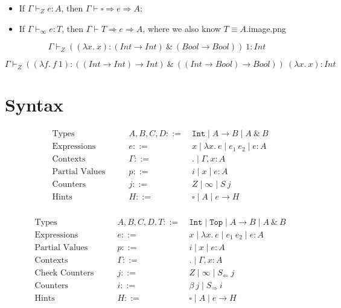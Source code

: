 \documentclass{article}
\begin{document}
\begin{itemize}
  \item If $\Gamma \vdash_Z e : A$, then $\Gamma \vdash \square \Rightarrow e \Rightarrow A$;
  \item If $\Gamma \vdash_{\infty} e : T$, then $\Gamma \vdash T \Rightarrow e \Rightarrow A$, where we also know $T \equiv A$.image.png
\end{itemize}



$$
\Gamma \vdash_{Z} ((\lambda x.~x) : (Int \to Int) ~\&~ (Bool \to Bool))~1 : Int
$$

$$
\Gamma \vdash_{Z} ((\lambda f. ~f~1) : ((Int \rightarrow Int) \to Int) ~\&~ ((Int \rightarrow Bool) \to Bool)) ~(\lambda x.~x) : Int
$$

\section{Syntax}

\begin{align*}
&\text{Types} \quad\quad &A, B, C, D ::=&~ \mathtt{Int} \mid A \rightarrow B \mid A ~\&~ B\\
&\text{Expressions} \quad \quad &e::=&~ x \mid \lambda x . ~e \mid e_1~e_2 \mid e : A\\
&\text{Contexts} \quad\quad &\Gamma::=&~ . \mid \Gamma, x : A\\
&\text{Partial Values} \quad \quad &p::=&~ i \mid x \mid e : A\\
&\text{Counters} \quad\quad &j ::=&~ Z \mid \infty \mid S~j\\
&\text{Hints} \quad\quad &H ::=&~ \square \mid A \mid \boxed{e} \rightarrow H\\
\end{align*}


\begin{align*}
  &\text{Types} \quad\quad &A, B, C, D, T ::=&~ \mathtt{Int} \mid \mathtt{Top} \mid A \rightarrow B \mid A~\&~B\\
  &\text{Expressions} \quad \quad &e::=&~ x \mid \lambda x . ~e \mid e_1~e_2 \mid e : A\\
  &\text{Partial Values} \quad \quad &p::=&~ i \mid x \mid e : A\\
  &\text{Contexts} \quad\quad &\Gamma::=&~ . \mid \Gamma, x : A\\
  &\text{Check Counters} \quad\quad &j ::=&~ Z \mid \infty \mid S_{\Leftarrow}~j \\
  &\text{Counters} \quad\quad &i ::= &~ \beta ~j \mid S_{\Rightarrow}~i\\
  &\text{Hints} \quad\quad &H ::=&~ \square \mid A \mid \boxed{e} \rightarrow H\\
\end{align*}
\end{document}
